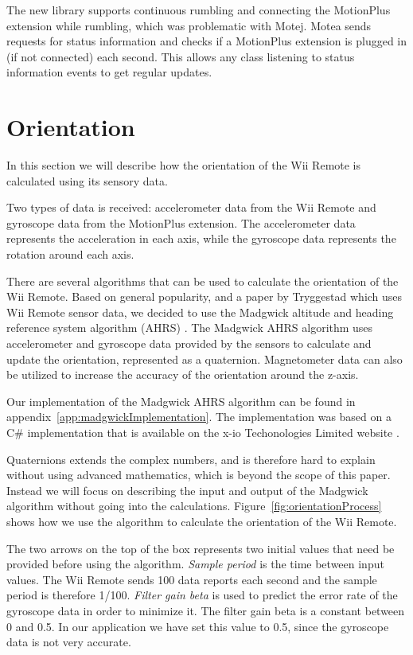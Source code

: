 The new library supports continuous rumbling and connecting the MotionPlus extension while rumbling, which was problematic with Motej. Motea sends requests for status information and checks if a MotionPlus extension is plugged in (if not connected) each second. This allows any class listening to status information events to get regular updates.

\section{Orientation}
In this section we will describe how the orientation of the Wii Remote is calculated using its sensory data.

Two types of data is received: accelerometer data from the Wii Remote and gyroscope data from the MotionPlus extension. The accelerometer data represents the acceleration in each axis, while the gyroscope data represents the rotation around each axis.

There are several algorithms that can be used to calculate the orientation of the Wii Remote. Based on general popularity, and a paper by Tryggestad \cite{Tryggestad} which uses Wii Remote sensor data, we decided to use the Madgwick altitude and heading reference system algorithm (AHRS) \cite{madgwick}. The Madgwick AHRS algorithm uses accelerometer and gyroscope data provided by the sensors to calculate and update the orientation, represented as a quaternion. Magnetometer data can also be utilized to increase the accuracy of the orientation around the z-axis.

Our implementation of the Madgwick AHRS algorithm can be found in appendix~\ref{app:madgwickImplementation}. The implementation was based on a C\# implementation that is available on the x-io Techonologies Limited website \cite{opensourceMadgwick}. 

Quaternions extends the complex numbers, and is therefore hard to explain without using advanced mathematics, which is beyond the scope of this paper. Instead we will focus on describing the input and output of the Madgwick algorithm without going into the calculations. Figure~\ref{fig:orientationProcess} shows how we use the algorithm to calculate the orientation of the Wii Remote. 

The two arrows on the top of the box represents two initial values that need be provided before using the algorithm. \emph{Sample period} is the time between input values. The Wii Remote sends 100 data reports each second and the sample period is therefore 1/100. \emph{Filter gain beta} is used to predict the error rate of the gyroscope data in order to minimize it. The filter gain beta is a constant between 0 and 0.5. In our application we have set this value to 0.5, since the gyroscope data is not very accurate.

